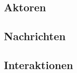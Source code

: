 

\subsection{Aktoren}\label{sec:actors}


\subsection{Nachrichten}\label{sec:messages}


\subsection{Interaktionen}\label{sec:interactions}

